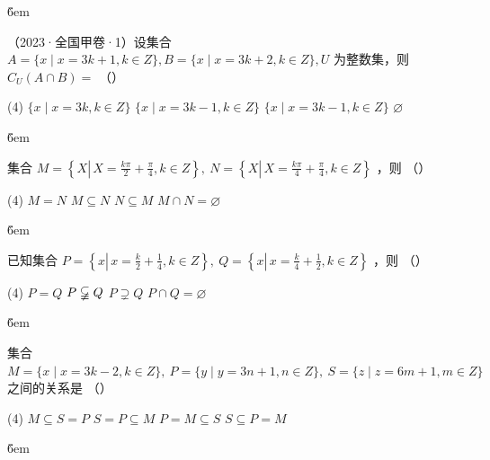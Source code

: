 \v{6em}

\begin{example}
    （2023·全国甲卷·1）设集合 $A=\{x \mid x=3 k+1, k \in Z\}, B=\{x \mid x=3 k+2, k \in Z\}, U$ 为整数集，则 \\
    $C_U(A \cap B)=$ （\qquad）
    \begin{tasks}(4)
        \task $\{x \mid x=3 k, k \in Z\}$
        \task $\{x \mid x=3 k-1, k \in Z\}$
        \task $\{x \mid x=3 k-1, k \in Z\}$
        \task $\varnothing$
    \end{tasks}
\end{example}

\v{6em}

\begin{example}
    集合 $M=\left\{X \left\lvert\, X=\frac{k \pi}{2}+\frac{\pi}{4}\right., k \in Z\right\}, ~ N=\left\{X \left\lvert\, X=\frac{k \pi}{4}+\frac{\pi}{4}\right., k \in Z\right\}$ ，则 （\qquad）
    \begin{tasks}(4)
        \task $M=N$
        \task $M \subseteq N$
        \task $N \subseteq M$
        \task $M \cap N=\varnothing$
    \end{tasks}
\end{example}

\v{6em}

\begin{example}
    已知集合 $P=\left\{x \left\lvert\, x=\frac{k}{2}+\frac{1}{4}\right., k \in Z\right\}, ~ Q=\left\{x \left\lvert\, x=\frac{k}{4}+\frac{1}{2}\right., k \in Z\right\}$ ，则 （\qquad）
    \begin{tasks}(4)
        \task $P=Q$
        \task $P \varsubsetneqq Q$
        \task $P \supsetneq Q$
        \task $P \cap Q=\varnothing$
    \end{tasks}
\end{example}

\v{6em}

\begin{example}
    集合 $M=\{x \mid x=3 k-2, k \in Z\}, ~ P=\{y \mid y=3 n+1, n \in Z\}, ~ S=\{z \mid z=6 m+1, m \in Z\}$ 之间的关系是 （\qquad）
    \begin{tasks}(4)
        \task $M \subseteq S=P$
        \task $S=P \subseteq M$
        \task $P=M \subseteq S$
        \task $S \subseteq P=M$
    \end{tasks}
\end{example}

\v{6em}
